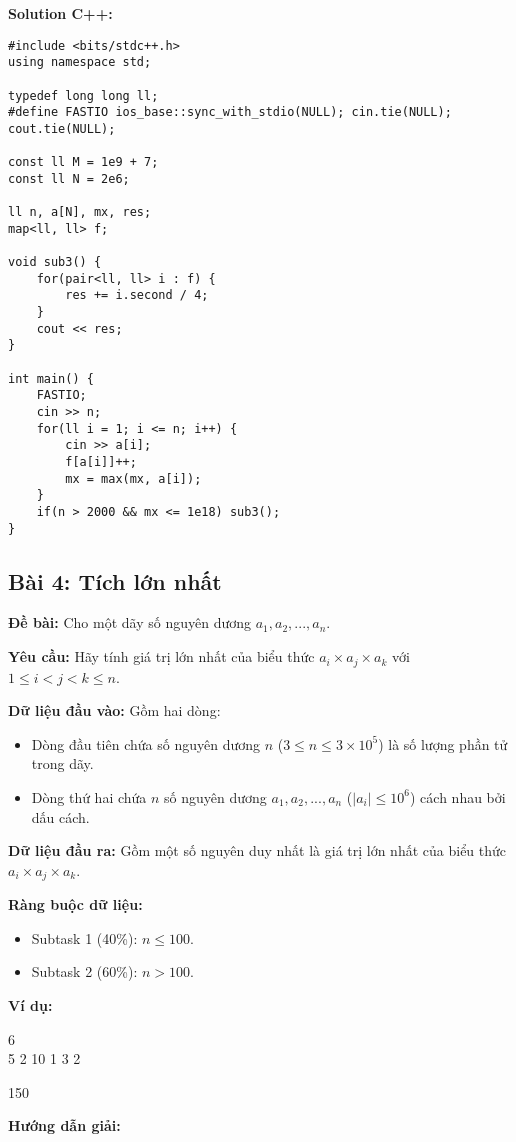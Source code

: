 \documentclass[12pt]{scrartcl}  %
\begin{document}
\textbf{Solution C++:}
\begin{lstlisting}
#include <bits/stdc++.h>
using namespace std;

typedef long long ll;
#define FASTIO ios_base::sync_with_stdio(NULL); cin.tie(NULL); cout.tie(NULL);

const ll M = 1e9 + 7;
const ll N = 2e6;

ll n, a[N], mx, res;
map<ll, ll> f;

void sub3() {
    for(pair<ll, ll> i : f) {
        res += i.second / 4;
    }
    cout << res;
}

int main() {
    FASTIO;
    cin >> n;
    for(ll i = 1; i <= n; i++) {
        cin >> a[i];
        f[a[i]]++;
        mx = max(mx, a[i]);
    }
    if(n > 2000 && mx <= 1e18) sub3();
}

\end{lstlisting}

\subsection{Bài 4: Tích lớn nhất}
\textbf{Đề bài:}
Cho một dãy số nguyên dương $a_1, a_2, ..., a_n$.

\textbf{Yêu cầu:}
Hãy tính giá trị lớn nhất của biểu thức $a_i \times a_j \times a_k$ với $1 \leq i < j < k \leq n$.

\textbf{Dữ liệu đầu vào:}
Gồm hai dòng:
\begin{itemize}
    \item Dòng đầu tiên chứa số nguyên dương $n$ ($3 \leq n \leq 3 \times 10^5$) là số lượng phần tử trong dãy.
    \item Dòng thứ hai chứa $n$ số nguyên dương $a_1, a_2, ..., a_n$ ($ |a_i| \leq 10^6$) cách nhau bởi dấu cách.
\end{itemize}

\textbf{Dữ liệu đầu ra:}
Gồm một số nguyên duy nhất là giá trị lớn nhất của biểu thức $a_i \times a_j \times a_k$.

\textbf{Ràng buộc dữ liệu:}
\begin{itemize}
    \item Subtask 1 (40\%): $n \leq 100$.
    \item Subtask 2 (60\%): $n > 100$.
\end{itemize}
\textbf{Ví dụ:}
\begin{tcolorbox}[colback=gray!5!white, colframe=blue!50!black, title=Input]
6\\
5 2 10 1 3 2
\end{tcolorbox}
\begin{tcolorbox}[colback=gray!5!white, colframe=green!50!black, title=Output]
150
\end{tcolorbox}
\textbf{Hướng dẫn giải:}
\end{document}
